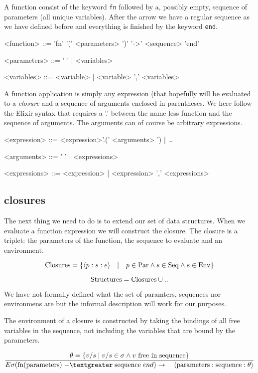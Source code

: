 \documentclass[a4paper,11pt]{article}
\begin{document}
A function consist of the keyword {\tt fn} followed by a, possibly
empty, sequence of parameters (all unique variables). After the arrow
we have a regular sequence as we have defined before and everything is
finished by the keyword {\tt end}.

\begin{grammar}
<function> ::= 'fn' '(' <parameters> ')' '-\textgreater' <sequence> 'end'

<parameters> ::= ' ' | <variables> 

<variables> ::= <variable> |  <variable> ',' <variables>
\end{grammar}

A function application is simply any expression (that hopefully will
be evaluated to a {\em closure} and a sequence of arguments enclosed
in parentheses. We here follow the Elixir syntax that requires a
'.' between the name less function and the sequence of arguments.
The arguments can of course be arbitrary expressions.

\begin{grammar}
<expression> ::=  <expression>'.(' <arguments> ') | \ldots 

<arguments> ::= '  ' | <expressions> 

<expressions> ::= <expression> | <expression> ',' <expressions>
\end{grammar}

\subsection{closures}

The next thing we need to do is to extend our set of data
structures. When we evaluate a function expression we will construct
the closure. The closure is a triplet: the parameters of the function,
the sequence to evaluate and an environment.

$${\rm Closures} = \{\langle p:s:e \rangle \quad | \quad p \in {\rm Par} \wedge s \in {\rm Seq} \wedge e \in {\rm Env}\}$$

$${\rm Structures} = {\rm Closures} \cup ..$$

We have not formally defined what the set of paramters, sequences nor
environmens are but the informal description will work for our
purposes.

The environment of a closure is constructed by taking the bindings of
all free variables in the sequence, not including the variables that
are bound by the parameters.

$$\frac{ \theta = \{ v/s \mid  v/s \in \sigma \wedge v {\rm\ free\  in\ sequence}\}}{
E\sigma({\rm fn}({\rm parameters})\; {\rm -\textgreater}\; {\rm sequence}\; end )\rightarrow \quad \langle{\rm parameters}:{\rm sequence}:\theta\rangle}$$
\end{document}
